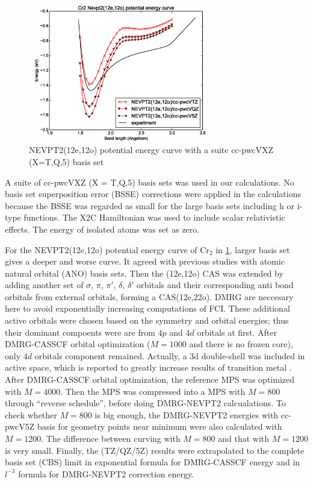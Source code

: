 \begin{figure}\label{fig:12o_nevpt2}
  \includegraphics[width=8cm,height=6cm]{application/12o-nevpt2.eps}
  \caption{NEVPT2(12e,12o) potential energy curve with a suite cc-pwcVXZ (X=T,Q,5) basis set}
\end{figure}

A suite of cc-pwcVXZ (X = T,Q,5) basis sets was used in our calculations. No basis set superposition error (BSSE) corrections were applied in the calculations because the BSSE was regarded as small for the large basis sets including h or i-type functions. The X2C Hamiltonian was used to include scalar relativistic effects. 
The energy of isolated atoms was set as zero.

For the NEVPT2(12e,12o) potential energy curve of Cr$_2$ in \ref{fig:12o_nevpt2}, larger basis set gives a deeper and worse curve. It agreed with previous studies with atomic natural orbital (ANO) basis sets.\cite{angeli_third-order_2006}
Then the (12e,12o) CAS was extended by adding another set of $\sigma$, $\pi$, $\pi'$, $\delta$, $\delta'$ orbitals and their corresponding anti bond orbitals from external orbitals, forming a CAS(12e,22o). 
DMRG are neccesary here to avoid exponentially increasing computations of FCI.
These additional active orbitals were chosen based on the symmetry and orbital energies; thus their dominant compoents were are from $4p$ and $4d$ orbitals at first. After DMRG-CASSCF orbital optimization ($M=1000$ and there is no frozen core), only $4d$ orbitals component remained. Actually, a 3d double-shell was included in active space, which is reported to greatly increase results of transition metal \cite{andersson_excitation_1992}.
After DMRG-CASSCF orbital optimization, the reference MPS was optimized with $M=4000$. Then the MPS was compressed into a MPS with $M=800$ through ``reverse schedule'', before doing DMRG-NEVPT2 calcualations. To check whether $M=800$ is big enough, the DMRG-NEVPT2 energies with cc-pwcV5Z basis for geometry points near minimum were also calculated with $M=1200$. The difference between curving with $M=800$ and that with $M=1200$ is very small. Finally, the (TZ/QZ/5Z) results were extrapolated to the complete basis set (CBS) limit in exponential formula for DMRG-CASSCF energy and in $l^{-3}$ formula for DMRG-NEVPT2 correction energy.


